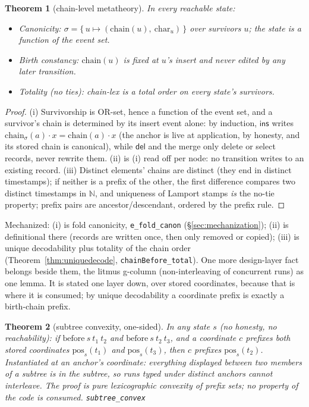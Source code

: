 \documentclass[11pt]{article}
\newtheorem{theorem}{Theorem}[section]
\newcommand{\lean}[1]{\texttt{#1}}
\newcommand{\del}{\mathsf{del}}
\newcommand{\ins}{\mathsf{ins}}
\newcommand{\chain}{\mathrm{chain}}
\begin{document}
\begin{theorem}[chain-level metatheory]\label{thm:chain}
In every reachable state:
\begin{itemize}
\item[(i)] \emph{Canonicity:} $\sigma = \{\,u \mapsto (\chain(u),\
\mathrm{char}_u)\,\}$ over survivors $u$; the state is a function
of the event set.
\item[(ii)] \emph{Birth constancy:} $\chain(u)$ is fixed at $u$'s
insert and never edited by any later transition.
\item[(iii)] \emph{Totality (no ties):} chain-lex is a total order
on every state's survivors.
\end{itemize}
\end{theorem}
\begin{proof}
(i) Survivorship is OR-set, hence a function of the event set, and a
survivor's chain is determined by its insert event alone: by
induction, $\ins$ writes $\chain_\sigma(a) \cdot x = \chain(a) \cdot
x$ (the anchor is live at application, by honesty, and its stored
chain is canonical), while $\del$ and the merge only delete or select
records, never rewrite them. (ii) is (i) read off per node: no
transition writes to an existing record. (iii) Distinct elements'
chains are distinct (they end in distinct timestamps); if neither is a
prefix of the other, the first difference compares two distinct
timestamps in $\mathbb{N}$, and uniqueness of Lamport stamps \emph{is}
the no-tie property; prefix pairs are ancestor/descendant, ordered by
the prefix rule.
\end{proof}

\noindent Mechanized: (i) is fold canonicity, \lean{e\_fold\_canon}
(\S\ref{sec:mechanization}); (ii) is definitional there (records are
written once, then only removed or copied); (iii) is unique
decodability plus totality of the chain order
(Theorem~\ref{thm:uniquedecode}, \lean{chainBefore\_total}). One more
design-layer fact belongs beside them, the litmus g-column
(non-interleaving of concurrent runs) as one lemma. It is stated one
layer down, over stored coordinates, because that is where it is
consumed; by unique decodability a coordinate prefix is exactly a
birth-chain prefix.

\begin{theorem}[subtree convexity, one-sided]
\label{thm:subtreeconvex}
In any state $s$ (no honesty, no reachability): if
$\mathrm{before}\ s\ t_1\ t_2$ and $\mathrm{before}\ s\ t_2\ t_3$,
and a coordinate $c$ prefixes both stored coordinates
$\mathrm{pos}_s(t_1)$ and $\mathrm{pos}_s(t_3)$, then $c$ prefixes
$\mathrm{pos}_s(t_2)$. Instantiated at an anchor's coordinate:
everything displayed between two members of a subtree is in the
subtree, so runs typed under distinct anchors cannot interleave. The
proof is pure lexicographic convexity of prefix sets; no property of
the code is consumed.
\hfill\lean{subtree\_convex}
\end{theorem}
\end{document}
